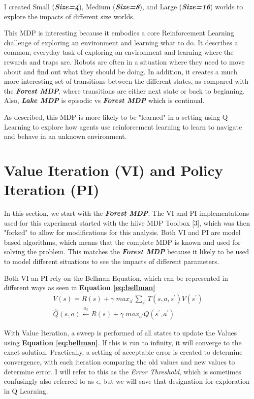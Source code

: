 \documentclass[letterpaper]{article} %
\begin{document}
I created Small (\textbf{\emph{Size=4}}), Medium (\textbf{\emph{Size=8}}), and Large (\textbf{\emph{Size=16}}) worlds to explore the impacts of different size worlds.  

This MDP is interesting because it embodies a core Reinforcement Learning challenge of exploring an environment and learning what to do.  It describes a common, everyday task of exploring an environment and learning where the rewards and traps are.  Robots are often in a situation where they need to move about and find out what they should be doing.  In addition, it creates a much more interesting set of transitions between the different states, as compared with the \textbf{\emph{Forest MDP}}, where transitions are either next state or back to beginning.  Also, \textbf{\emph{Lake MDP}} is episodic vs  \textbf{\emph{Forest MDP}} which is continual.

As described, this MDP is more likely to be "learned" in a setting using Q Learning to explore how agents use reinforcement learning to learn to navigate and behave in an unknown environment.

\section{Value Iteration (VI) and Policy Iteration (PI)}
In this section, we start with the \textbf{\emph{Forest MDP}}.   The VI and PI implementations used for this experiment started with the hiive MDP Toolbox [3], which was then "forked" to allow for modifications for this analysis.  Both VI and PI are model based algorithms, which means that the complete MDP is known and used for solving the problem.  This matches the \textbf{\emph{Forest MDP}} because it likely to be used to model different situations to see the impacts of different parameters.   

Both VI an PI rely on the Bellman Equation, which can be represented in different ways as seen in  \textbf{Equation \ref{eq:bellman}} 
\begin{equation} 
\label{eq:bellman}
\begin{gathered}
V(s) = R(s) + \gamma \; max_{a^\prime}  \sum_{s^\prime} T(s,a,s^\prime) V(s^\prime)\\
\hat{Q}(s,a) \xleftarrow{\alpha_t} R(s) + \gamma \;  max_{a^\prime} Q(s^\prime, a^\prime)
\end{gathered}
\end{equation}

With Value Iteration, a sweep is performed of all states to update the Values using \textbf{Equation \ref{eq:bellman}}.  If this is run to infinity, it will converge to the exact solution.  Practically, a setting of acceptable error is created to determine convergence, with each iteration comparing the old values and new values to determine error.  I will refer to this as the \emph{Error Threshold}, which is sometimes confusingly also referred to as $\epsilon$, but we will save that designation for exploration in Q Learning. 
\end{document}
